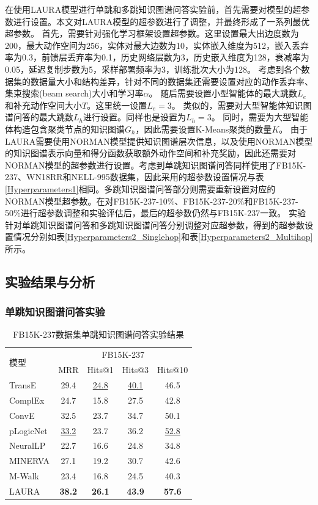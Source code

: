 \documentclass[algorithmlist, AutoFakeBold, AutoFakeSlant, figurelist, tablelist, nomlist, engineering, openany]{seuthesix} %
\begin{document}
在使用LAURA模型进行单跳和多跳知识图谱问答实验前，首先需要对模型的超参数进行设置。本文对LAURA模型的超参数进行了调整，并最终形成了一系列最优超参数。
首先，需要针对强化学习框架设置超参数。这里设置最大出边度数为200，最大动作空间为256，实体对最大边数为10，实体嵌入维度为512，嵌入丢弃率为0.3，前馈层丢弃率为0.1，历史网络层数为3，历史嵌入维度为128，衰减率为0.05，延迟复制步数为5，采样部署频率为3，训练批次大小为128。
考虑到各个数据集的数据量大小和结构差异，针对不同的数据集还需要设置对应的动作丢弃率、集束搜索(beam search)大小和学习率$\alpha$。
随后需要设置小型智能体的最大跳数$L_e$和补充动作空间大小$T$。这里统一设置$L_e = 3$。
类似的，需要对大型智能体知识图谱问答的最大跳数$L_h$进行设置。同样也是设置为$L_h = 3$。
同时，需要为大型智能体构造包含聚类节点的知识图谱$G_h$，因此需要设置K-Means聚类的数量$K$。
由于LAURA需要使用NORMAN模型提供知识图谱层次信息，以及使用NORMAN模型的知识图谱表示向量和得分函数获取额外动作空间和补充奖励，因此还需要对NORMAN模型的超参数进行设置。考虑到单跳知识图谱问答同样使用了FB15K-237、WN18RR和NELL-995数据集，因此采用的超参数设置情况与表\ref{Hyperparameters1}相同。多跳知识图谱问答部分则需要重新设置对应的NORMAN模型超参数。在对FB15K-237-10\%、FB15K-237-20\%和FB15K-237-50\%进行超参数调整和实验评估后，最后的超参数仍然与FB15K-237一致。
实验针对单跳知识图谱问答和多跳知识图谱问答分别调整对应超参数，得到的超参数设置情况分别如表\ref{Hyperparameters2_Singlehop}和表\ref{Hyperparameters2_Multihop}所示。

\subsection{实验结果与分析}
\subsubsection{单跳知识图谱问答实验}

\begin{table}[t]
  \centering
  \caption{FB15K-237数据集单跳知识图谱问答实验结果}
  \begin{tabular*}{0.95\textwidth}{@{\extracolsep{\fill}}lcccc}
    \toprule[1pt]
    \multirow{2}{*}{模型} & \multicolumn{4}{c}{FB15K-237}   \\
      & MRR & Hits@1 & Hits@3 & Hits@10 \\ \hline
    TransE & 29.4 & \underline{24.8} & \underline{40.1} & 46.5 \\
    ComplEx & 24.7 & 15.8 & 27.5 & 42.8 \\
    ConvE & 32.5 & 23.7 & 34.7 & 50.1 \\
    pLogicNet & \underline{33.2} & 23.7 & 36.2 & \underline{52.8} \\
    NeuralLP & 22.7 & 16.6 & 24.8 & 34.8 \\
    MINERVA & 27.1 & 19.2 & 30.7 & 42.6 \\
    M-Walk & 23.4 & 16.8 & 24.5 & 40.3 \\
    LAURA & \textbf{38.2} & \textbf{26.1} & \textbf{43.9} & \textbf{57.6} \\
    \bottomrule[1pt]
  \end{tabular*}
  \label{Experiment2_FB15K-237}
\end{table}
\end{document}
